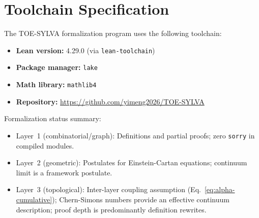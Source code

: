\documentclass[11pt,a4paper]{article}
\theoremstyle{definition}
\theoremstyle{remark}
\begin{document}
\section{Toolchain Specification}\label{app:toolchain}

The TOE-SYLVA formalization program uses the following toolchain:
\begin{itemize}[noitemsep]
\item \textbf{Lean version:} 4.29.0 (via \texttt{lean-toolchain})
\item \textbf{Package manager:} \texttt{lake}
\item \textbf{Math library:} \texttt{mathlib4}
\item \textbf{Repository:} \url{https://github.com/yimeng2026/TOE-SYLVA}
\end{itemize}

Formalization status summary:
\begin{itemize}[noitemsep]
\item Layer~1 (combinatorial/graph): Definitions and partial proofs; zero
\texttt{sorry} in compiled modules.
\item Layer~2 (geometric): Postulates for Einstein-Cartan equations;
continuum limit is a framework postulate.
\item Layer~3 (topological): Inter-layer coupling assumption (Eq.~\ref{eq:alpha-cumulative}); Chern-Simons numbers provide an effective continuum description; proof depth is predominantly definition rewrites.
\end{itemize}
\end{document}
